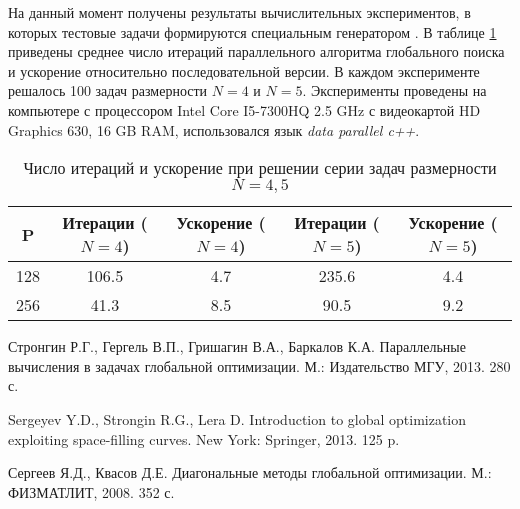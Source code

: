 \documentclass[11pt, oneside, a4paper]{article}
\begin{document}
На данный момент получены результаты вычислительных экспериментов, в которых тестовые задачи формируются специальным генератором \cite{GKLS}. В таблице \ref{table:GKLS_RES} приведены среднее число итераций параллельного алгоритма глобального поиска и ускорение относительно последовательной версии. В каждом эксперименте решалось 100 задач размерности \(N = 4\) и \(N = 5\). Эксперименты проведены на компьютере с процессором Intel Core I5-7300HQ 2.5 GHz с видеокартой HD Graphics 630, 16 GB RAM, использовался язык \textit{data parallel c++}.
\begin{table}[!hbp]
    \centering
    \caption{Число итераций и ускорение при решении серии задач размерности $N=4,5$}
    \begin{tabular}{|c|c|c|c|c|}
    \hline
    P    & Итерации ($N=4$) & Ускорение ($N=4$) &         Итерации ($N=5$) & Ускорение ($N=5$) \\ \hline
	128 & 106.5   & 4.7      &         235.6   & 4.4      \\ \hline
	256 & 41.3    & 8.5      &         90.5    & 9.2      \\ \hline
	\end{tabular}
    
    \label{table:GKLS_RES}
\end{table}



\begin{biblio}



Стронгин Р.Г., Гергель В.П., Гришагин В.А., Баркалов К.А. Параллельные вычисления в задачах глобальной оптимизации. М.: Издательство МГУ, 2013. 280 с.

Sergeyev Y.D., Strongin R.G., Lera D. Introduction to global optimization exploiting space-filling curves. New York: Springer, 2013. 125 p.

Сергеев Я.Д., Квасов Д.Е. Диагональные методы глобальной оптимизации. М.: ФИЗМАТЛИТ, 2008. 352 с.



\end{biblio}
\end{document}
